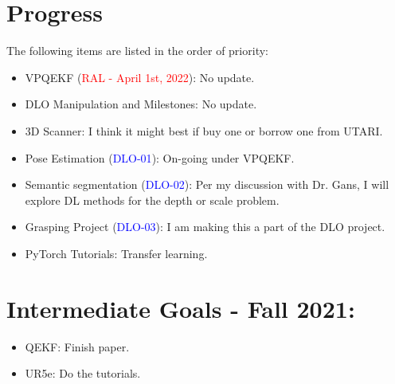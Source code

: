\documentclass[11pt]{article}
\begin{document}
\section{Progress}
The following items are listed in the order of priority:
\begin{itemize}
    \item VPQEKF (\textcolor{red}{RAL - April 1st, 2022}): No update.
    \item DLO Manipulation and Milestones: No update.
    \item 3D Scanner: I think it might best if buy one or borrow one from UTARI.
    \item Pose Estimation (\textcolor{blue}{DLO-01}): On-going under VPQEKF.
    \item Semantic segmentation (\textcolor{blue}{DLO-02}): Per my discussion with Dr. Gans, I
    will explore DL methods for the depth or scale problem.
    \item Grasping Project (\textcolor{blue}{DLO-03}): I am making this a part of the DLO project.
    \item PyTorch Tutorials: Transfer learning.

  \end{itemize}

\section{Intermediate Goals - Fall 2021:}
\begin{itemize}
      \item QEKF: Finish paper.
      \item UR5e: Do the tutorials.
\end{itemize}

\newpage

% 
% 
\end{document}
